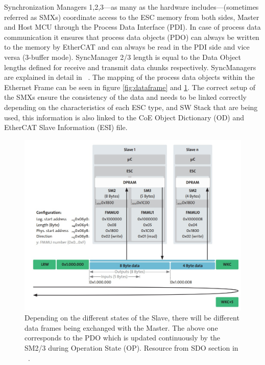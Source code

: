 Synchronization Managers 1,2,3---as many as the hardware includes---(sometimes referred as SMXs) coordinate access to the ESC 
memory from both sides, Master and
Host MCU through the Process Data Interface (PDI). In case of process data communication it ensures that process data objects (PDO) 
can
always be written to the memory by EtherCAT and can always be read in the PDI side and vice versa (3-buffer mode). 
SyncManager 2/3 length is equal
to the Data Object lengths defined for receive and transmit data chunks respectively. SyncManagers are explained in detail in ~\cite{beckhoff_datalink}. %
The mapping of the process data objects within the Ethernet Frame can be seen in figure \ref{fig:dataframe} and \ref{fig:pdomapping}.
The correct setup of the SMXs ensure the consistency of the data and needs to be linked correctly depending on the characteristics of each ESC type,
 and SW Stack that are being used, this information is also linked to the CoE Object Dictionary (OD) and EtherCAT Slave Information (ESI) file.
\begin{figure}[ht]
    \centering
    \includegraphics[width=.85\textwidth]{imgs/impl-dataframe_pdo.jpg}
    \caption{Depending on the different states of the Slave, there will be different data frames being exchanged with the Master. 
    The above one corresponds to the PDO which is updated continuously by the SM2/3 during Operation State (OP). Resource from SDO section in ~\cite{beckhoff_applayer}.}
    \label{fig:pdomapping}
\end{figure}